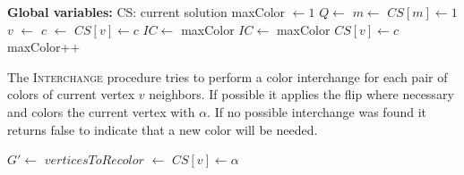 \begin{alg}
	\label{alg:slfi}
 \end{alg}
 \begin{algorithmic}[1]
  \Statex \textbf{Global variables:}
 \Statex CS: current solution
        \ls maxColor $\gets 1$
        \ls $Q \gets $  
        \ls $m \gets $ 
        \ls $CS[m] \gets 1$
        \ls {}
            \ls {}
        \mEndFor
            \ls $v$ $\gets$ 
            \ls {}
            \ls $c$ $\gets$ 
                \ls $CS[v] \gets c$
                    \ls $IC \gets$ maxColor
                \mEndIf
            \mElse
                    \ls {}
                \mEndFor
                    \ls $IC \gets$ maxColor
                \mEndIf
                \mElse
                    \ls $CS[v] \gets c$
                    \ls maxColor++
                \mEndIf
            \mEndIf
        \mEndWhile
	\mEndProcedure
\end{algorithmic}
\vspace{10pt}

The \textsc{Interchange} procedure tries to perform a color interchange for each pair of colors of current vertex $v$ neighbors. If possible it applies the flip where necessary and colors the current vertex with $\alpha$. If no possible interchange was found it returns false to indicate that a new color will be needed.

\vspace{10pt}
\begin{algorithmic}[1]
            \ls $G' \gets$ 
            \ls $verticesToRecolor$ $\gets$ 
                    \ls {}
                \mEndFor
                \ls $CS[v] \gets \alpha$
                \ls \RETURN \TRUE
            \mEndIf
        \mEndFor
        \ls \RETURN \FALSE
	\mEndProcedure
\end{algorithmic}
\vspace{10pt}

